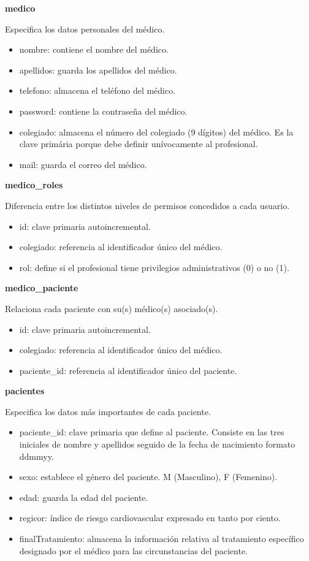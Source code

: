 \documentclass[11pt,spanish,
		listoftables,listoffigures]
		{tfgplantilla}
\begin{document}
\noindent
\textbf {medico}

Especifica los datos personales del médico.
\begin{itemize}	
	\item nombre: contiene el nombre del médico.
	\item apellidos: guarda los apellidos del médico.
	\item telefono: almacena el teléfono del médico.
	\item password: contiene la contraseña del médico.
	\item colegiado: almacena el número del colegiado (9 dígitos) del médico. Es la clave primária porque debe definir unívocamente al profesional.
	\item mail: guarda el correo del médico.
\end{itemize}

\noindent
\textbf {medico\_roles}

Diferencia entre los distintos niveles de permisos concedidos a cada usuario.
\begin{itemize}
	\item id: clave primaria autoincremental.
	\item colegiado: referencia al identificador único del médico.
	\item rol: define si el profesional tiene privilegios administrativos (0) o no (1).
\end{itemize}

\noindent
\textbf {medico\_paciente}

Relaciona cada paciente con su(s) médico(s) asociado(s).
\begin{itemize}
	\item id: clave primaria autoincremental.
	\item colegiado: referencia al identificador único del médico.
	\item paciente\_id: referencia al identificador único del paciente.
\end{itemize}

\noindent
\textbf {pacientes}

Especifica los datos más importantes de cada paciente.
\begin{itemize}
	\item paciente\_id: clave primaria que define al paciente. Consiste en las tres iniciales de nombre y apellidos seguido de la fecha de nacimiento formato ddmmyy.
	\item sexo: establece el género del paciente. M (Masculino), F (Femenino).
	\item edad: guarda la edad del paciente.
	\item regicor: índice de riesgo cardiovascular expresado en tanto por ciento.
	\item finalTratamiento: almacena la información relativa al tratamiento específico designado por el médico para las circunstancias del paciente.
\end{itemize}
\end{document}

